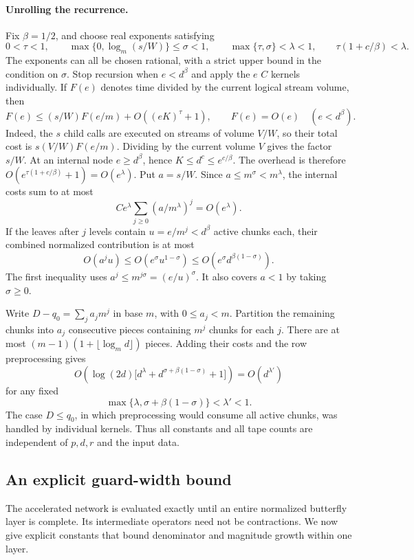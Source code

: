 \documentclass[11pt]{article}
\theoremstyle{definition}
\begin{document}
\paragraph{Unrolling the recurrence.}
Fix \(\beta=1/2\), and choose real exponents satisfying
\[
 0<\tau<1,\qquad
 \max\{0,\log_m(s/W)\}\le\sigma<1,
 \qquad \max\{\tau,\sigma\}<\lambda<1,
 \qquad \tau(1+c/\beta)<\lambda.
\]
The exponents can all be chosen rational, with a strict upper bound
in the condition on \(\sigma\).  Stop recursion when
\(e<d^\beta\) and apply the \(e\) \(C\) kernels individually.  If
\(F(e)\) denotes time divided by the current logical stream volume,
then
\[
 F(e)\le (s/W)F(e/m)+O((eK)^\tau+1),
 \qquad F(e)=O(e)\quad(e<d^\beta).
\]
Indeed, the \(s\) child calls are executed on streams of volume
\(V/W\), so their total cost is \(s(V/W)F(e/m)\).  Dividing by
the current volume \(V\) gives the factor \(s/W\).
At an internal node \(e\ge d^\beta\), hence
\(K\le d^c\le e^{c/\beta}\).  The overhead is therefore
\(O(e^{\tau(1+c/\beta)}+1)=O(e^\lambda)\).
Put \(a=s/W\).  Since \(a\le m^\sigma<m^\lambda\), the internal
costs sum to at most
\[
 C e^\lambda\sum_{j\ge0}(a/m^\lambda)^j=O(e^\lambda).
\]
If the leaves after \(j\) levels contain \(u=e/m^j<d^\beta\)
active chunks each, their combined normalized
contribution is at most
\[
 O(a^ju)\le O(e^\sigma u^{1-\sigma})
          \le O(e^\sigma d^{\beta(1-\sigma)}).
\]
The first inequality uses
\(a^j\le m^{j\sigma}=(e/u)^\sigma\).  It also covers \(a<1\)
by taking \(\sigma\ge0\).

Write \(D-q_0=\sum_j a_jm^j\) in base \(m\), with \(0\le a_j<m\).
Partition the remaining chunks into \(a_j\) consecutive pieces
containing \(m^j\) chunks for each \(j\).
There are at most \((m-1)(1+\lfloor\log_m d\rfloor)\) pieces.
Adding their costs and the row preprocessing gives
\[
 O\!\left(\log(2d)
    \bigl[d^\lambda+d^{\sigma+\beta(1-\sigma)}+1\bigr]\right)
   =O(d^{\lambda'})
\]
for any fixed
\[
 \max\{\lambda,\sigma+\beta(1-\sigma)\}<\lambda'<1.
\]
The case \(D\le q_0\), in which preprocessing would consume all
active chunks, was handled by individual kernels.  Thus all constants
and all tape counts are independent of \(p,d,r\) and the input data.

\subsection{An explicit guard-width bound}

The accelerated network is evaluated exactly until an entire
normalized butterfly layer is complete.  Its intermediate operators
need not be contractions.  We now give explicit constants that bound
denominator and magnitude growth within one layer.
\end{document}
